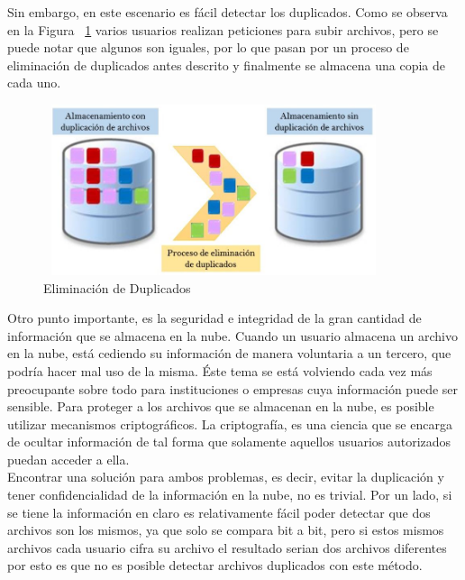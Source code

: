 Sin embargo, en este escenario es f\'acil detectar los duplicados. Como se observa en la Figura ~\ref{fig:1-1-3} varios usuarios realizan peticiones para subir archivos, pero se puede notar que algunos son iguales, por lo que pasan por un proceso de eliminación de duplicados antes descrito y finalmente se almacena una copia de cada uno. \\

\begin{figure}[H]
\centering
\includegraphics[width=10cm, height=5cm]{./images/Deduplicacion.jpg}
\caption{Eliminación de Duplicados}
\label{fig:1-1-3}
\end{figure}


Otro punto importante, es la seguridad e integridad de la gran cantidad de información que se almacena en la nube. Cuando un usuario almacena un archivo en la nube, est\'a cediendo su informaci\'on de manera voluntaria a un tercero, que podr\'ia hacer mal uso de la misma. Éste tema se está volviendo cada vez más preocupante sobre todo para instituciones o empresas cuya información puede ser sensible. Para proteger a los archivos que se almacenan en la nube, es posible utilizar mecanismos criptogr\'aficos. La criptografía, es una ciencia que se encarga de ocultar información de tal forma que solamente aquellos usuarios autorizados puedan acceder a ella. \\

Encontrar una soluci\'on para ambos problemas, es decir, evitar la duplicaci\'on y tener confidencialidad de la informaci\'on en la nube, no es trivial. Por un lado, si se tiene la información en claro es relativamente fácil poder detectar que dos archivos son los mismos, ya que solo se compara bit a bit, pero si estos mismos archivos cada usuario cifra su archivo el resultado serian dos archivos diferentes por esto es que no es posible detectar archivos duplicados con este método. 


